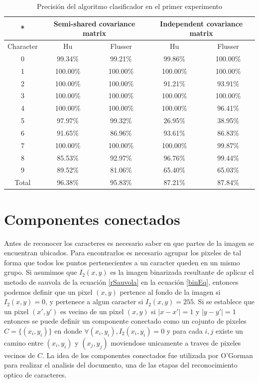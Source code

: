 \documentclass[a4paper, 11pt, oneside]{report}
\begin{document}
	\begin{table}
	\begin{center}
	\begin{tabular}{|c|c|c|c|c|}
		\hline
		* & \multicolumn{2}{|c|}{Semi-shared covariance matrix} &
			\multicolumn{2}{|c|}{Independent covariance matrix} \\
		\hline
		Character & Hu & Flusser & Hu & Flusser \\
		\hline
		0 & 99.34\% & 99.21\% & 99.86\% & 100.00\% \\
		1 &	100.00\% & 100.00\% & 100.00\% & 100.00\% \\
		2 &	100.00\% & 100.00\% & 91.21\% & 93.91\% \\
		3 &	100.00\% & 100.00\% & 100.00\% & 100.00\% \\
		4 &	100.00\% & 100.00\%	& 100.00\% & 96.41\% \\		
		5 & 97.97\% & 99.32\% & 26.95\% & 38.95\% \\ 
		6 & 91.65\% & 86.96\% & 93.61\% & 86.83\% \\
		7 & 100.00\% & 100.00\% & 100.00\% & 99.87\% \\
		8 & 85.53\% & 92.97\% & 96.76\% & 99.44\% \\
		9 &	89.52\% & 81.06\% & 65.40\% & 65.03\% \\
		\hline
		Total & 96.38\% & 95.83\% & 87.21\% & 87.84\% \\
		\hline
	\end{tabular}
	\end{center}
	\caption{Precisión del algoritmo clasificador en el primer experimento}	
	\label{tb:sauvolaFast}
	\end{table}

\section{Componentes conectados}
\label{sect:conComponents}

Antes de reconocer los caracteres es necesario saber en que partes de la imagen se encuentran ubicados. Para encontrarlos es necesario agrupar los pixeles de tal forma que todos los puntos pertenecientes a un caracter queden en un mismo grupo. Si asumimos que $I_2(x,y)$ es la imagen binarizada resultante de aplicar el metodo de sauvola de la ecuación \eqref{rSauvola} en la ecuación \eqref{binEq}, entonces podemos definir que un pixel $(x,y)$ pertence al fondo de la imagen si $I_2(x,y)=0$, y pertenece a algun caracter si $I_2(x,y)=255$. Si se establece que un pixel $(x',y')$ es vecino de un pixel $(x,y)$ si $|x-x'|=1$ y $|y-y'|=1$ entonces se puede definir un componente conectado como un cojunto de pixeles $C=\{(x_i,y_i)\}$ en donde $\forall{(x_i,y_i)}, I_2(x_i,y_i)=0$ y para cada $i,j$ existe un camino entre $(x_i,y_i)$ y $(x_j,y_j)$ moviendose unicamente a traves de pixeles vecinos de $C$. La idea de los componentes conectados fue utilizada por O'Gorman \cite{docstrum93} para realizar el analisis del documento, una de las etapas del reconocimiento optico de caracteres.
\end{document}
